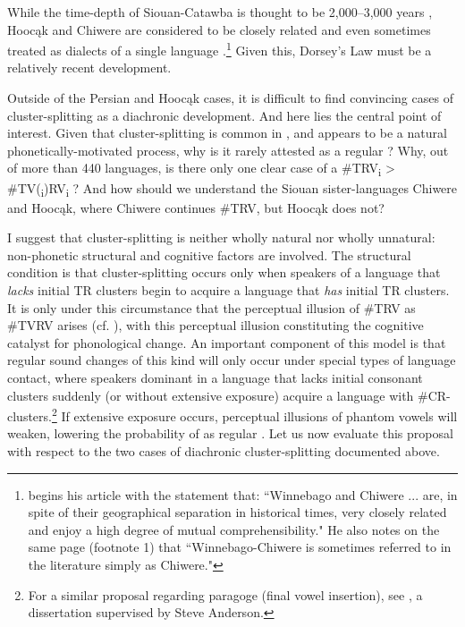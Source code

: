 \documentclass[output=paper,
modfonts
]{LSP/langsci}
\begin{document}
While the time-depth of Siouan-Catawba is thought to be 2,000--3,000
years \citep{parks2001a}, Hoocąk and Chiwere are considered to be
closely related and even sometimes treated as dialects of a single
language \citep{miner1979a}.\footnote{\citet[25]{miner1979a} begins his article with
  the statement that: ``Winnebago and Chiwere ... are, in spite of their
  geographical separation in historical times, very closely related and
  enjoy a high degree of mutual comprehensibility." He also notes on the
  same page (footnote 1) that ``Winnebago-Chiwere is sometimes referred
  to in the literature simply as Chiwere."} Given this, Dorsey's Law
must be a relatively recent development.

Outside of the Persian and Hoocąk cases, it is difficult to find
convincing cases of cluster-splitting  as a diachronic
development. And here lies the central point of interest. Given that
cluster-splitting  is common in   , and
appears to be a natural phonetically-motivated process, why is it rarely
attested as a regular ? Why, out of more than 440
 languages, is there only one clear case of a
\#TRV\textsubscript{i} \textgreater{}
\#TV(\textsubscript{i})RV\textsubscript{i} ? And how should
we understand the Siouan sister-languages Chiwere and Hoocąk, where
Chiwere continues \#TRV, but Hoocąk does not?

I suggest that cluster-splitting  is neither wholly natural
nor wholly unnatural: non-phonetic structural and cognitive factors are
involved. The structural condition is that cluster-splitting 
occurs only when speakers of a language that \emph{lacks} initial TR
clusters begin to acquire a language that \emph{has} initial TR
clusters. It is only under this circumstance that the perceptual
illusion of \#TRV as \#TVRV arises (cf. \citealt{dupoux1999a}), with this
perceptual illusion constituting the cognitive catalyst for phonological
change. An important component of this model is that regular sound
changes of this kind will only occur under special types of language
contact, where speakers dominant in a language that lacks initial
consonant clusters suddenly (or without extensive exposure) acquire a
language with \#CR-clusters.\footnote{For a similar proposal regarding
  paragoge (final vowel insertion), see \citet{ng2015a}, a
  dissertation supervised by Steve Anderson.} If
extensive exposure occurs, perceptual illusions of phantom vowels will
weaken, lowering the probability of  as regular .
Let us now evaluate this proposal with respect to the two cases of
diachronic cluster-splitting  documented above.
\end{document}
